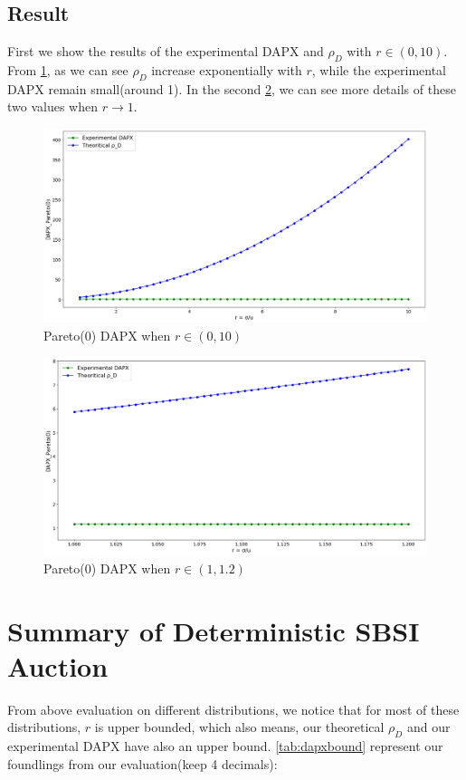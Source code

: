 \subsection{Result}
First we show the results of the experimental DAPX and $\rho_D$ with $r \in (0,10)$. From \cref{fig:pareto_dapx_r_large}, as we can see $\rho_D$ increase exponentially with $r$, while the experimental DAPX remain small(around 1). In the second \cref{fig:pareto_dapx_r_small}, we can see more details of these two values when $r \to 1$. 
\begin{figure}[H]
	\centering
	\includegraphics[width=1\textwidth]{pareto_dapx_r_large}
	\caption{Pareto(0) DAPX when $r \in (0,10)$}
	\label{fig:pareto_dapx_r_large}
\end{figure}
\begin{figure}[H]
	\centering
	\includegraphics[width=1\textwidth]{pareto_dapx_r_small}
	\caption{Pareto(0) DAPX when $r \in (1, 1.2)$}
	\label{fig:pareto_dapx_r_small}
\end{figure}


\section{Summary of Deterministic SBSI Auction}
From above evaluation on different distributions, we notice that for most of these distributions, $r$ is upper bounded, which also means, our theoretical $\rho_D$ and our experimental DAPX have also an upper bound. \cref{tab:dapxbound} represent our foundlings from our evaluation(keep 4 decimals): 

